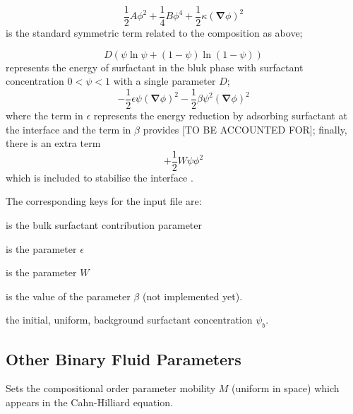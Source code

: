 \begin{equation}
{\textstyle \frac{1}{2}}A\phi^2
+ {\textstyle \frac{1}{4}}B\phi^4
+ {\textstyle \frac{1}{2}}\kappa (\mathbf{\nabla}\phi)^2
\end{equation}
is the standard symmetric term related to the composition as above;

\begin{equation}
D \left(\psi \ln\psi + (1 - \psi) \ln(1-\psi)\right)
\end{equation}
represents the energy of surfactant in the bluk phase with surfactant
concentration $0 < \psi < 1$ with a single parameter $D$;
\begin{equation}
-{\textstyle \frac{1}{2}} \epsilon \psi (\mathbf{\nabla} \phi)^2
-{\textstyle \frac{1}{2}} \beta \psi^2  (\mathbf{\nabla} \phi)^2
\end{equation}
where the term in $\epsilon$ represents the energy reduction by
adsorbing surfactant at the interface and the term in $\beta$
provides [TO BE ACCOUNTED FOR]; finally, there is an extra term
\begin{equation}
+{\textstyle \frac{1}{2}} W \psi \phi^2
\end{equation}
which is included to stabilise the interface \cite{theissengompper}.

The corresponding keys for the input file are:


is the bulk surfactant contribution parameter


is the parameter $\epsilon$


is the parameter $W$


is the value of the parameter $\beta$ (not implemented yet).


the initial, uniform, background surfactant concentration $\psi_b$.


\subsection{Other Binary Fluid Parameters}


Sets the compositional order parameter mobility $M$ (uniform in space)
which appears in the Cahn-Hilliard equation. 


